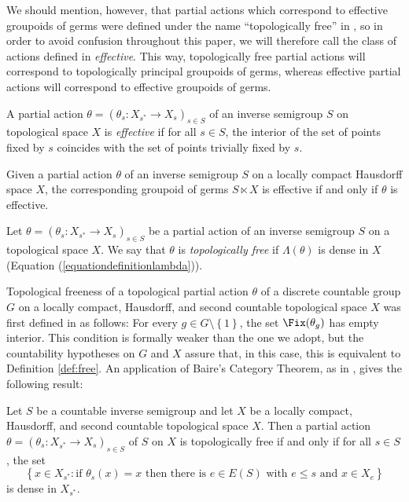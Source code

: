 We should mention, however, that partial actions which correspond to effective groupoids of germs were defined under the name ``topologically free'' in \cite{MR3448414}, so in order to avoid confusion throughout this paper, we will therefore call the class of actions defined in \cite{MR3448414} \emph{effective}. This way, topologically free partial actions will correspond to topologically principal groupoids of germs, whereas effective partial actions will correspond to effective groupoids of germs.
 
\begin{definition}[{\cite[Definition~4.1]{MR3448414}}]
A partial action $\theta=\left(\theta_s:X_{s^*}\to X_s\right)_{s\in S}$ of an inverse semigroup $S$ on  topological space $X$ is \emph{effective} if for all $s\in S$, the interior of the set of points fixed by $s$ coincides with the set of points trivially fixed by $s$.
\end{definition}

\begin{proposition}[{\cite[Theorem~4.7]{MR3448414}}]\label{prop:effectiveactiongroupoid}
Given a partial action $\theta$ of an inverse semigroup $S$ on a locally compact Hausdorff space $X$, the corresponding groupoid of germs $S\ltimes X$ is effective if and only if $\theta$ is effective.
\end{proposition}

\begin{definition}\label{def:free}
Let $\theta=\left(\theta_s:X_{s^*}\to X_s\right)_{s\in S}$ be a partial action of an inverse semigroup $S$ on a topological space $X$. We say that $\theta$ is \emph{topologically free} if $\Lambda(\theta)$ is dense in $X$ (Equation (\ref{equationdefinitionlambda})).
\end{definition}

Topological freeness of a topological partial action $\theta$ of a discrete countable group $G$ on a locally compact, Hausdorff, and second countable topological space $X$ was first defined in \cite[Definition 2.3]{MR3694599} as follows: For every $g\in G\setminus\left\{1\right\}$, the set $\Fix(\theta_g)$ has empty interior. This condition is formally weaker than the one we adopt, but the countability hypotheses on $G$ and $X$ assure that, in this case, this is equivalent to Definition \ref{def:free}. An application of Baire's Category Theorem, as in \cite[Lemma~2.4]{MR3694599}, gives the following result:

\begin{proposition}
Let $S$ be a countable inverse semigroup and let $X$ be a locally compact, Hausdorff, and second countable topological space $X$. Then a partial action $\theta=\left(\theta_s:X_{s^*}\to X_s\right)_{s\in S}$ of $S$ on $X$ is topologically free if and only if for all $s\in S$, the set
\[\left\{x\in X_{s^*}:\text{if }\theta_s(x)=x\text{ then there is }e\in E(S)\text{ with }e\leq s\text{ and }x\in X_e\right\}\]
is dense in $X_{s^*}$.
\end{proposition}


